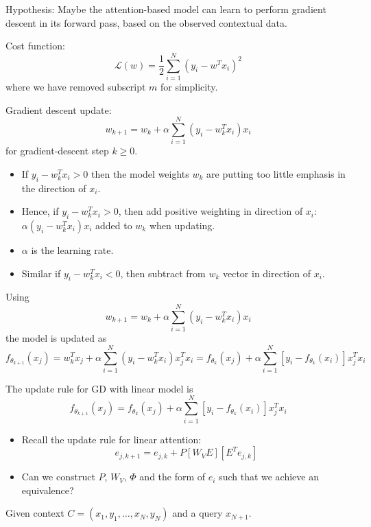 \documentclass[12pt]{extarticle}
\begin{document}
Hypothesis: Maybe the attention-based model can learn to perform gradient descent in its forward pass, based on the observed contextual data.

Cost function:
\[
\mathcal{L}(w) = \frac{1}{2} \sum_{i=1}^{N} (y_i - w^T x_i)^2
\]
where we have removed subscript $m$ for simplicity.

Gradient descent update:
\[
w_{k+1} = w_k + \alpha \sum_{i=1}^{N} (y_i - w_k^T x_i) x_i
\]
for gradient-descent step $k \geq 0$.

\begin{itemize}
    \item If $y_i - w_k^T x_i > 0$ then the model weights $w_k$ are putting too little emphasis in the direction of $x_i$.
    
    \item Hence, if $y_i - w_k^T x_i > 0$, then add positive weighting in direction of $x_i$: $\alpha(y_i - w_k^T x_i) x_i$ added to $w_k$ when updating.
    
    \item $\alpha$ is the learning rate.
    
    \item Similar if $y_i - w_k^T x_i < 0$, then subtract from $w_k$ vector in direction of $x_i$.
\end{itemize}

Using
\[
w_{k+1} = w_k + \alpha \sum_{i=1}^{N} (y_i - w_k^T x_i) x_i
\]
the model is updated as
\[
f_{\theta_{k+1}}(x_j) = w_k^T x_j + \alpha \sum_{i=1}^{N} (y_i - w_k^T x_i) x_j^T x_i = f_{\theta_k}(x_j) + \alpha \sum_{i=1}^{N} [y_i - f_{\theta_k}(x_i)] x_j^T x_i
\]

The update rule for GD with linear model is
\[
f_{\theta_{k+1}}(x_j) = f_{\theta_k}(x_j) + \alpha \sum_{i=1}^{N} [y_i - f_{\theta_k}(x_i)] x_j^T x_i
\]

\begin{itemize}
    \item Recall the update rule for linear attention:
    \[
    e_{j,k+1} = e_{j,k} + P[W_V E][E^T e_{j,k}]
    \]
    
    \item Can we construct $P$, $W_V$, $\Phi$ and the form of $e_i$ such that we achieve an equivalence?
\end{itemize}

Given context $C = (x_1, y_1, \ldots, x_N, y_N)$ and a query $x_{N+1}$.
\end{document}
